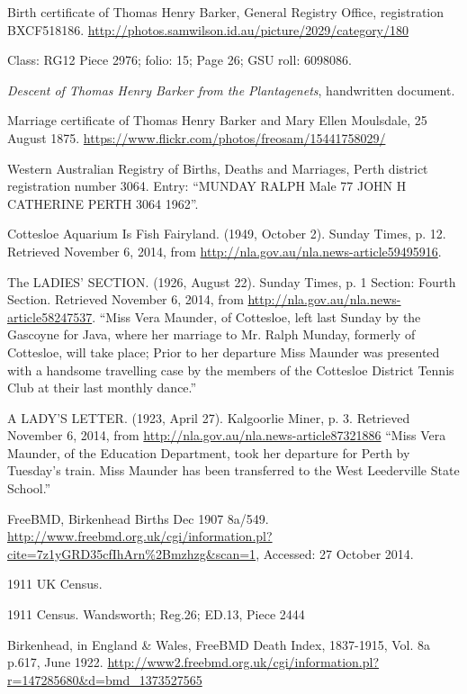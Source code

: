 \begin{thebibliography}{99}
	Birth certificate of Thomas Henry Barker, General Registry Office, registration BXCF518186.
	\url{http://photos.samwilson.id.au/picture/2029/category/180}

	Class: RG12 Piece 2976; folio: 15; Page 26; GSU roll: 6098086.

	\emph{Descent of Thomas Henry Barker from the Plantagenets},
	handwritten document.

	Marriage certificate of Thomas Henry Barker and Mary Ellen Moulsdale, 25 August 1875.
	\url{https://www.flickr.com/photos/freosam/15441758029/}

	 Western Australian Registry of Births, Deaths and Marriages, Perth district registration number 3064.
	 Entry: ``MUNDAY RALPH 	Male 	77 	JOHN H 	CATHERINE 		PERTH 	3064 	1962''.

    Cottesloe Aquarium Is Fish Fairyland.
    (1949, October 2). Sunday Times, p. 12. Retrieved November 6, 2014,
    from \url{http://nla.gov.au/nla.news-article59495916}.

	The LADIES' SECTION. (1926, August 22). Sunday Times, p. 1 Section: Fourth Section.
	Retrieved November 6, 2014, from \url{http://nla.gov.au/nla.news-article58247537}.
	``Miss Vera Maunder, of Cottesloe, left last Sunday by the Gascoyne for Java, where her marriage to Mr. Ralph Munday, formerly of Cottesloe, will take place; Prior to her departure Miss Maunder was presented with a handsome travelling case by the members of the Cottesloe District Tennis Club at their last monthly dance.''

	A LADY'S LETTER. (1923, April 27). Kalgoorlie Miner, p. 3.
	Retrieved November 6, 2014, from \url{http://nla.gov.au/nla.news-article87321886}
	``Miss Vera Maunder, of the Education Department, took her departure for Perth by Tuesday's train.
	Miss Maunder has been transferred to the West Leederville State School.''

	FreeBMD, Birkenhead Births Dec 1907 8a/549.
	\url{http://www.freebmd.org.uk/cgi/information.pl?cite=7z1yGRD35cfIhArn\%2Bmzhzg&scan=1}, Accessed: 27 October 2014.

	1911 UK Census.

	1911 Census. Wandsworth; Reg.26; ED.13, Piece 2444

	Birkenhead, in England \& Wales, FreeBMD Death Index, 1837-1915, Vol. 8a p.617, June 1922.
	\url{http://www2.freebmd.org.uk/cgi/information.pl?r=147285680&d=bmd_1373527565}


\end{thebibliography}
